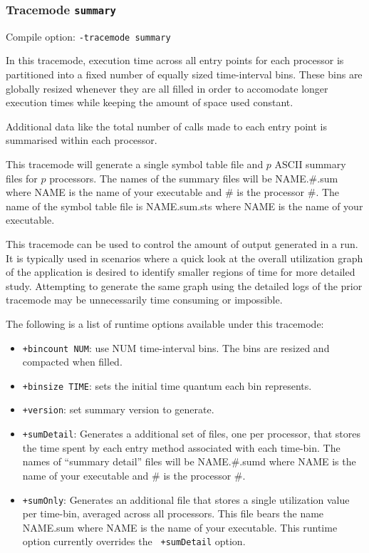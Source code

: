 \subsubsection{Tracemode {\tt summary}}

Compile option: {\tt -tracemode summary}

In this tracemode, execution time across all entry points for each
processor is partitioned into a fixed number of equally sized
time-interval bins. These bins are globally resized whenever they are
all filled in order to accomodate longer execution times while keeping
the amount of space used constant.

Additional data like the total number of calls made to each entry
point is summarised within each processor.

This tracemode will generate a single symbol table file and $p$ ASCII
summary files for $p$ processors. The names of the summary files will
be NAME.\#.sum where NAME is the name of your executable and \# is the
processor \#. The name of the symbol table file is NAME.sum.sts where NAME
is the name of your executable.

This tracemode can be used to control the amount of output generated
in a run. It is typically used in scenarios where a quick look at the
overall utilization graph of the application is desired to identify
smaller regions of time for more detailed study. Attempting to
generate the same graph using the detailed logs of the prior tracemode
may be unnecessarily time consuming or impossible.

The following is a list of runtime options available under this tracemode:

\begin{itemize}
\item
{\tt +bincount NUM}:   use NUM time-interval bins. The bins are resized and compacted when filled.
\item
{\tt +binsize TIME}:   sets the initial time quantum each bin represents.
\item
{\tt +version}:        set summary version to generate.
\item
{\tt +sumDetail}: Generates a additional set of files, one per processor,
that stores the time spent by each entry method associated with each 
time-bin. The names of ``summary detail'' files will be NAME.\#.sumd where
NAME is the name of your executable and \# is the processor \#.
\item
{\tt +sumOnly}: Generates an additional file that stores a single
utilization value per time-bin, averaged across all processors. This
file bears the name NAME.sum where NAME is the name of your
executable. This runtime option currently overrides the {\tt
+sumDetail} option.
\end{itemize}

